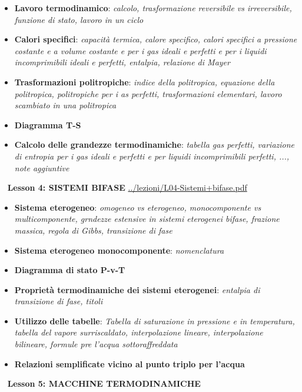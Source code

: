\begin{itemize}
    \item \textbf{Lavoro termodinamico}: \textit{calcolo, trasformazione reversibile vs irreversibile, funzione di stato, lavoro in un ciclo}
    \item \textbf{Calori specifici}: \textit{capacità termica, calore specifico, calori specifici a pressione costante e a volume costante e per i gas ideali e perfetti e per i liquidi incomprimibili ideali e perfetti, entalpia, relazione di Mayer}
    \item \textbf{Trasformazioni politropiche}: \textit{indice della politropica, equazione della politropica, politropiche per i as perfetti, trasformazioni elementari, lavoro scambiato in una politropica}
    \item \textbf{Diagramma T-S}
    \item \textbf{Calcolo delle grandezze termodinamiche}: \textit{tabella gas perfetti, variazione di entropia per i gas ideali e perfetti e per liquidi incomprimibili perfetti, ..., note aggiuntive}
\end{itemize}
\ \newline
\newline
\textbf{Lesson 4: SISTEMI BIFASE}\newline
\url{../lezioni/L04-Sistemi+bifase.pdf}
\begin{itemize}
    \item \textbf{Sistema eterogeneo}: \textit{omogeneo vs eterogeneo, monocomponente vs multicomponente, grndezze estensive in sistemi eterogenei bifase, frazione massica, regola di Gibbs, transizione di fase}
    \item \textbf{Sistema eterogeneo monocomponente}: \textit{nomenclatura}
    \item \textbf{Diagramma di stato P-v-T}
    \item \textbf{Proprietà termodinamiche dei sistemi eterogenei}: \textit{entalpia di transizione di fase, titoli}
    \item \textbf{Utilizzo delle tabelle}: \textit{Tabella di saturazione in pressione e in temperatura, tabella del vapore surriscaldato, interpolazione lineare, interpolazione bilineare, formule pre l'acqua sottoraffreddata}
    \item \textbf{Relazioni semplificate vicino al punto triplo per l'acqua}
\end{itemize}
\ \newline
\newline
\textbf{Lesson 5: MACCHINE TERMODINAMICHE}\newline
